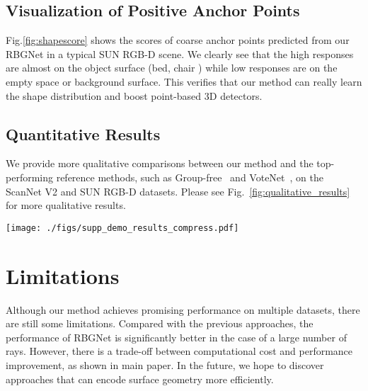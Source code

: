 \documentclass[final]{cvpr}
\begin{document}
\subsection{Visualization of Positive Anchor Points} \label{sec:shapescore}
Fig.\ref{fig:shapescore} shows the scores of coarse anchor points predicted from our RBGNet in a typical SUN RGB-D scene. We clearly see that the high responses are almost on the object surface (bed, chair \etc) while low responses are on the empty space or background surface. This verifies that our method can really learn the shape distribution and boost point-based 3D detectors.

\subsection{Quantitative Results} \label{sec:qresults}
We provide more qualitative comparisons between our method and the top-performing reference methods, such as Group-free~\cite{liu2021group} and VoteNet~\cite{qi2019deep}, on the ScanNet V2 and SUN RGB-D datasets. Please see Fig.~\ref{fig:qualitative_results} for more qualitative results. 


\begin{figure*}[t]
  \centering
  \vspace{-10pt}
   \texttt{[image: ./figs/supp\_demo\_results\_compress.pdf]}
   \caption{Qualitative results on ScanNet V2(top) and SUN RGB-D(down). The baseline methods are Group-free~\cite{liu2021group} and VoteNet~\cite{qi2019deep}.}
   \label{fig:qualitative_results}
\end{figure*}

\section{Limitations}\label{sec:discuss}
Although our method achieves promising performance on multiple datasets, there are still some limitations. Compared with the previous approaches, the performance of RBGNet is significantly better in the case of a large number of rays. However, there is a trade-off between computational cost and performance improvement, as shown in main paper. In the future, we hope to discover approaches that can encode surface geometry more efficiently.  
\end{document}
